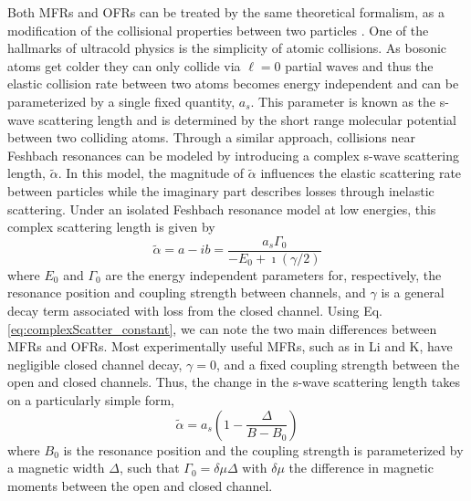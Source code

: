 Both MFRs and OFRs can be treated by the same theoretical formalism, as a modification of the collisional properties between two particles \cite{Nicholson2015a,Chin2010}. One of the hallmarks of ultracold physics is the simplicity of atomic collisions. As bosonic atoms get colder they can only collide via $\ell=0$ partial waves and thus the elastic collision rate between two atoms becomes energy independent and can be parameterized by a single fixed quantity, $a_s$. This parameter is known as the s-wave scattering length and is determined by the short range molecular potential between two colliding atoms. Through a similar approach, collisions near Feshbach resonances can be modeled by introducing a complex s-wave scattering length, $\tilde{\alpha}$. In this model, the magnitude of $\tilde{\alpha}$ influences the elastic scattering rate between particles while the imaginary part describes losses through inelastic scattering. Under an isolated Feshbach resonance model at low energies, this complex scattering length is given by \cite{Chin2010}
	\begin{equation} \label{eq:complexScatter_constant}
		\tilde{\alpha} = a - ib = \frac{a_s \Gamma_0}{-E_0 + \imath (\gamma/2)}
	\end{equation}
where $E_0$ and $\Gamma_0$ are the energy independent parameters for, respectively, the resonance position and coupling strength between channels, and $\gamma$ is a general decay term associated with loss from the closed channel. Using Eq.\;\ref{eq:complexScatter_constant}, we can note the two main differences between MFRs and OFRs. Most experimentally useful MFRs, such as in Li and K, have negligible closed channel decay, $\gamma = 0$, and a fixed coupling strength between the open and closed channels. Thus, the change in the s-wave scattering length takes on a particularly simple form, 
	\begin{equation} \label{eq:MFRscatter}
		\tilde{\alpha} = a_s \left( 1- \frac{\Delta}{B - B_0} \right)
	\end{equation}
where $B_0$ is the resonance position and the coupling strength is parameterized by a magnetic width $\Delta$, such that $\Gamma_0 = \delta \mu \Delta$ with $\delta \mu$ the difference in magnetic moments between the open and closed channel. 

